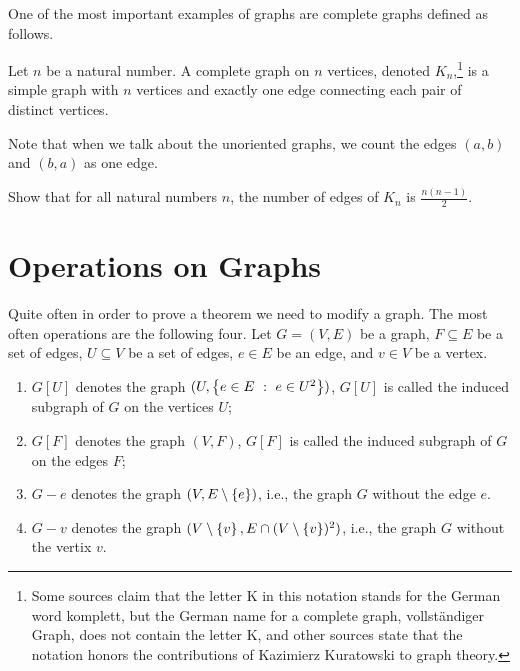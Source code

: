 One of the most important examples of graphs are complete graphs defined as
follows.
\begin{definition}
  Let $n$ be a natural number. A complete graph on $n$ vertices, denoted
  $K_n$,\footnote[][-2cm]{%
    Some sources claim that the letter K in this notation stands for the German
    word komplett, but the German name for a complete graph, vollst\"{a}ndiger
    Graph, does not contain the letter K, and other sources state that the
    notation honors the contributions of Kazimierz Kuratowski to graph theory.
  } is a simple graph with $n$ vertices and exactly one edge connecting
  each pair of distinct vertices.
\end{definition}

Note that when we talk about the unoriented graphs, we count the edges $(a, b)$
and $(b, a)$ as one edge.
\begin{exercise}
  Show that for all natural numbers $n$, the number of edges of $K_n$
  is $\frac{n(n - 1)}{2}$.
\end{exercise}

\section{Operations on Graphs}
Quite often in order to prove a theorem we need to modify a graph. The most
often operations are the following four. Let $G = (V, E)$ be a graph,
$F \subseteq E$ be a set of edges, $U \subseteq V$ be a set of edges,
$e \in E$ be an edge, and $v \in V$ be a vertex.
\begin{enumerate}
  \item $G[U]$ denotes the graph $(U, \set[e \in U^2]{e \in E})$,
    $G[U]$ is called the induced subgraph of $G$ on the vertices $U$;
  \item $G[F]$ denotes the graph $(V, F)$, $G[F]$ is called the induced
    subgraph of $G$ on the edges $F$;
  \item $G - e$ denotes the graph $(V, E \setminus \set{e})$, i.e., the graph $G$
    without the edge $e$.
  \item $G - v$ denotes the graph
    $(V \setminus \set{v}, E \cap (V \setminus \set{v})^2)$, i.e., the graph $G$
    without the vertix $v$.
\end{enumerate}

